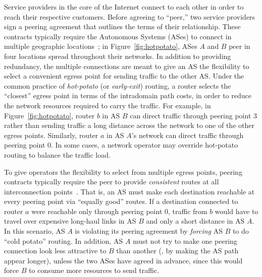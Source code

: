 
\label{sec:dynamic_intro}
Service providers in the core of the Internet connect to each other in
order to reach their respective customers.  Before agreeing to
``peer,'' two service providers sign a peering agreement that outlines
the terms of their relationship.  These contracts typically require
the Autonomous Systems (ASes) to connect in multiple geographic
locations~\cite{www-aol}; in Figure~\ref{fig:hotpotato}, ASes
$A$ and $B$ peer in four locations spread throughout their networks.
In addition to providing redundancy, the multiple connections are
meant to give an AS the flexibility to select a convenient egress
point for sending traffic to the other AS.  Under the common practice
of {\em hot-potato\/} (or {\em early-exit\/}) routing, a router
selects the ``closest'' egress point in terms of the intradomain path
costs, in order to reduce the network resources required to carry the
traffic.  For example, in Figure~\ref{fig:hotpotato}, router $b$ in AS
$B$ can direct traffic through peering point $3$ rather than sending
traffic a long distance across the network to one of the other egress
points.  Similarly, router $a$ in AS $A$'s network can direct traffic
through peering point $0$.  In some cases, a network operator may
override hot-potato routing
to balance the traffic load.

To give operators the flexibility to select from multiple egress
points, peering contracts typically require the peer to provide {\em
consistent\/} routes at all interconnection points~\cite{www-aol}.  That
is, an AS must make each destination reachable at every peering point
via ``equally good'' routes.  If a destination connected to router $a$
were reachable only through peering point $0$, traffic from $b$ would
have to travel over expensive long-haul links in AS $B$ and only a
short distance in AS $A$.  In this scenario, AS $A$ is violating its
peering agreement by {\em forcing\/} AS $B$ to do ``cold potato''
routing.  In addition,
AS $A$ must not try to make one peering connection look less
attractive to $B$ than another (\eg, by making the AS path appear
longer), unless the two ASes have agreed in advance, since this would
force $B$ to consume more resources to send traffic.

